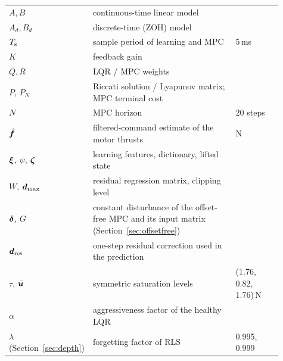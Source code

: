 \begin{longtable}{p{0.18\linewidth}p{0.55\linewidth}p{0.18\linewidth}}
$A, B$ & continuous-time linear model & \\
$A_d, B_d$ & discrete-time (ZOH) model & \\
$T_{\mathrm{s}}$ & sample period of learning and MPC & 5\,ms \\
$K$ & feedback gain & \\
$Q, R$ & LQR / MPC weights & \\
$P$, $P_N$ & Riccati solution / Lyapunov matrix; MPC terminal cost & \\
$N$ & MPC horizon & 20 steps \\
$\hat{\boldsymbol{f}}$ & filtered-command estimate of the motor thrusts & N \\
$\boldsymbol{\xi}$, $\psi$, $\boldsymbol{\zeta}$ & learning features, dictionary, lifted state & \\
$W$, $\boldsymbol{d}_{\max}$ & residual regression matrix, clipping level & \\
$\boldsymbol{\delta}$, $G$ & constant disturbance of the offset-free MPC and its input matrix (Section~\ref{sec:offsetfree}) & \\
$\boldsymbol{d}_{\mathrm{res}}$ & one-step residual correction used in the prediction & \\
$\tau$, $\bar{\boldsymbol{u}}$ & symmetric saturation levels & (1.76, 0.82, 1.76)\,N \\
$\alpha$ & aggressiveness factor of the healthy LQR & \\
$\lambda$ (Section~\ref{sec:depth}) & forgetting factor of RLS & 0.995, 0.999 \\
\bottomrule
\end{longtable}
\normalsize

